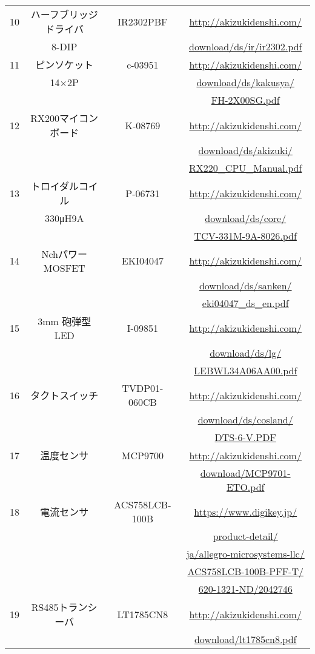 \begin{tabular}{|c|c|c|c|} \hline
10&ハーフブリッジドライバ&IR2302PBF&\url{http://akizukidenshi.com/}\\
  &8-DIP&    &\url{download/ds/ir/ir2302.pdf}\\ \hline
11&ピンソケット&c-03951&\url{http://akizukidenshi.com/}\\
  &14×2P&    &\url{download/ds/kakusya/}\\
  &      &    &\url{FH-2X00SG.pdf}\\ \hline
12&RX200マイコンボード&K-08769&\url{http://akizukidenshi.com/}\\
  &                   &       &\url{download/ds/akizuki/}\\
  &                   &       &\url{RX220_CPU_Manual.pdf}\\ \hline
13&トロイダルコイル&P-06731&\url{http://akizukidenshi.com/}\\
  &330μH9A&     &\url{download/ds/core/}\\
  &        &     &\url{TCV-331M-9A-8026.pdf}\\ \hline
14&NchパワーMOSFET&EKI04047&\url{http://akizukidenshi.com/}\\
  &               &        &\url{download/ds/sanken/}\\
  &               &        &\url{eki04047_ds_en.pdf}\\ \hline
15&3mm 砲弾型LED&I-09851&\url{http://akizukidenshi.com/}\\
  &             &       &\url{download/ds/lg/}\\
  &&&\url{LEBWL34A06AA00.pdf}\\ \hline
16&タクトスイッチ&TVDP01-060CB&\url{http://akizukidenshi.com/}\\
&&&\url{download/ds/cosland/}\\
&&&\url{DTS-6-V.PDF}\\ \hline
17&温度センサ&MCP9700&\url{http://akizukidenshi.com/}\\
&&&\url{download/MCP9701-ETO.pdf}\\ \hline
18&電流センサ&ACS758LCB-100B&\url{https://www.digikey.jp/}\\
&&&\url{product-detail/}\\
&&&\url{ja/allegro-microsystems-llc/}\\
&&&\url{ACS758LCB-100B-PFF-T/}\\
&&&\url{620-1321-ND/2042746}\\ \hline
19&RS485トランシーバ&LT1785CN8&\url{http://akizukidenshi.com/}\\
&&&\url{download/lt1785cn8.pdf}\\ \hline
\end{tabular}

